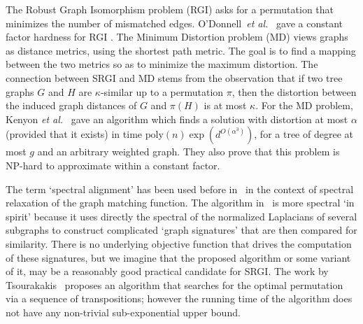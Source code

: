 
The Robust Graph Isomorphism problem (RGI) asks for a permutation
that minimizes the number of mismatched edges. 
O'Donnell~{\it et al.}~\cite{odonnell} gave a constant
factor hardness for RGI . The Minimum Distortion problem (MD) views graphs as distance metrics, using
the shortest path metric. The goal is to find a mapping between
the two metrics so as to minimize the maximum
distortion. The connection
between SRGI and MD stems from the observation that if two tree graphs
$G$ and $H$ are $\kappa$-similar up to a permutation
$\pi$, then the distortion between the
induced graph distances of $G$ and $\pi(H)$ is at most $\kappa$. 
For the MD problem, Kenyon {\it et al.}~\cite{KRS} gave an
algorithm which finds a solution with distortion at most $\alpha$
(provided that it exists) in time
$\mathrm{poly} (n) \exp(d^{O(\alpha^3)})$, for a tree of degree
at most $g$ and an arbitrary weighted graph. They also prove that this problem is NP-hard to
approximate within a constant factor.

The term `spectral alignment' has been used before in~\cite{FeiziQMMKJ16} in the context of spectral relaxation of the graph matching function. The algorithm in~\cite{Patrok12} is more spectral `in spirit' because it
uses directly the spectral of the normalized Laplacians of several subgraphs to construct complicated `graph signatures' that are then compared for similarity. There is no underlying objective function that drives 
the computation of these signatures, but we imagine that the proposed algorithm or some variant 
of it, may be a reasonably good practical candidate for SRGI.
The work by Tsourakakis~\cite{Tsourakakis14} proposes an algorithm that searches
for the optimal permutation via a sequence of transpositions; however
the running time of the algorithm does not have any non-trivial sub-exponential
upper bound. 






